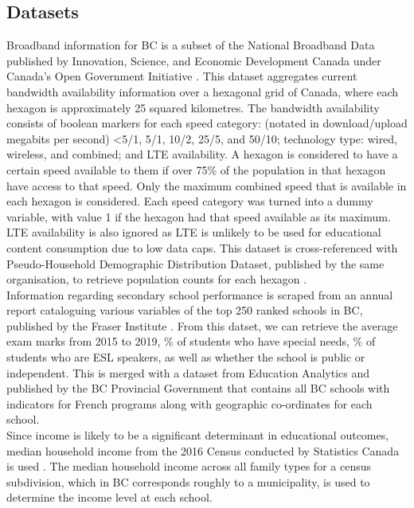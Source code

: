 \documentclass[stu, floatsintext]{apa7}
\begin{document}
    \subsection{Datasets}
    Broadband information for BC is a subset of the National Broadband Data published by Innovation, Science, and Economic Development Canada under Canada's Open Government Initiative \autocite{nbd2021}. This dataset aggregates current bandwidth availability information over a hexagonal grid of Canada, where each hexagon is approximately 25 squared kilometres. The bandwidth availability consists of boolean markers for each speed category: (notated in download/upload megabits per second) <5/1, 5/1, 10/2, 25/5, and 50/10; technology type: wired, wireless, and combined; and LTE availability. A hexagon is considered to have a certain speed available to them if over 75\% of the population in that hexagon have access to that speed. Only the maximum combined speed that is available in each hexagon is considered. Each speed category was turned into a dummy variable, with value 1 if the hexagon had that speed available as its maximum. LTE availability is also ignored as LTE is unlikely to be used for educational content consumption due to low data caps. This dataset is cross-referenced with Pseudo-Household Demographic Distribution Dataset, published by the same organisation, to retrieve population counts for each hexagon \autocite{phh2020}. \\
    Information regarding secondary school performance is scraped from an annual report cataloguing various variables of the top 250 ranked schools in BC, published by the Fraser Institute \autocite{fraser}. From this datset, we can retrieve the average exam marks from 2015 to 2019, \% of students who have special needs, \% of students who are ESL speakers, as well as whether the school is public or independent. This is merged with a dataset from Education Analytics and published by the BC Provincial Government that contains all BC schools with indicators for French programs \autocite{francophone2020} along with geographic co-ordinates for each school. \\
    Since income is likely to be a significant determinant in educational outcomes, median household income from the 2016 Census conducted by Statistics Canada is used \autocite{census2016}. The median household income across all family types for a census subdivision, which in BC corresponds roughly to a municipality, is used to determine the income level at each school. \\
\end{document}

